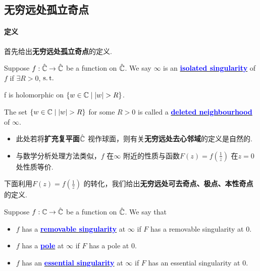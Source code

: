 \vspace{4em}
\subsection{无穷远处孤立奇点}
\paragraph{定义}
	首先给出\textbf{无穷远处孤立奇点}的定义.
	\begin{defn}\label{def 8.6.3}
		Suppose $f : \hat{\mathbb{C}} \rightarrow \hat{\mathbb{C}}$ be a function on $\hat{\mathbb{C}}$. We say $\infty$ is an \underline{\textcolor{blue}{\textbf{isolated singularity}}} of $f$ if $\exists R > 0$, $\operatorname{s.t.}$ 
		\begin{center}
			f is holomorphic on $\{ w \in \mathbb{C} \mid \left| w \right| > R \}$.
		\end{center}
		The set $\{ w \in \mathbb{C} \mid \left| w \right| > R \}$ for some $R > 0$ is called a \underline{\textcolor{blue}{\textbf{deleted neighbourhood}}} of $\infty$.
		
		\vspace{2em}
		
		\begin{rmk}
			\begin{itemize}
				\item 此处若将\textbf{扩充复平面$\hat{\mathbb{C}}$} 视作球面，则有关\textbf{无穷远处去心邻域}的定义是自然的.
				
				\vspace{1em}
				
				\item 与数学分析处理方法类似，$f$ 在$\infty$ 附近的性质与函数$F(z) = f(\frac{1}{z})$ 在$z = 0$ 处性质等价.
			\end{itemize}
		\end{rmk}
	\end{defn}

	\newpage
	下面利用$F(z) = f(\frac{1}{z})$ 的转化，我们给出\textbf{无穷远处可去奇点、极点、本性奇点}的定义.
	\begin{defn}\label{def 8.6.4}
		Suppose $f : \mathbb{C} \rightarrow \hat{\mathbb{C}}$ be a function on $\hat{\mathbb{C}}$. We say that 
		\begin{itemize}
			\item $f$ has a \underline{\textcolor{blue}{\textbf{removable singularity}}} at $\infty$ if $F$ has a removable singularity at $0$.
			
			\item $f$ has a \underline{\textcolor{blue}{\textbf{pole}}} at $\infty$ if $F$ has a pole at $0$.
			
			\item $f$ has an \underline{\textcolor{blue}{\textbf{essential singularity}}} at $\infty$ if $F$ has an essential singularity at $0$.
		\end{itemize}
	\end{defn}

